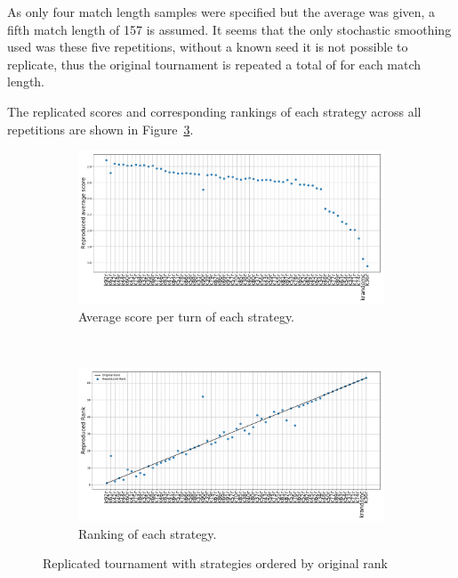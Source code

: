 \documentclass{article}
\begin{document}
As only four match length samples were specified but the average was given, a
fifth match length of 157 is assumed.  It seems that the only stochastic
smoothing used was these five repetitions, without a known seed it is not
possible to replicate, thus the original tournament is repeated a total of
for each match length.

The replicated scores and corresponding rankings of each strategy across all
repetitions are shown in
Figure~\ref{fig:replicated_tournament}.

\begin{figure}[!hbtp]
    \centering
    \begin{subfigure}[t]{.5\textwidth}
        \includegraphics[width=.95\textwidth]{assets/original_tournament_scores.pdf}
        \caption{Average score per turn of each strategy.}
        \label{fig:original_tournament_scores}
    \end{subfigure}%
    ~
    \begin{subfigure}[t]{0.5\textwidth}
        \includegraphics[width=.95\textwidth]{assets/original_tournament_rankings.pdf}
        \caption{Ranking of each strategy.}
        \label{fig:original_tournament_ranks}
    \end{subfigure}
    \caption{Replicated tournament with strategies ordered by original rank}
    \label{fig:replicated_tournament}
\end{figure}
\end{document}
